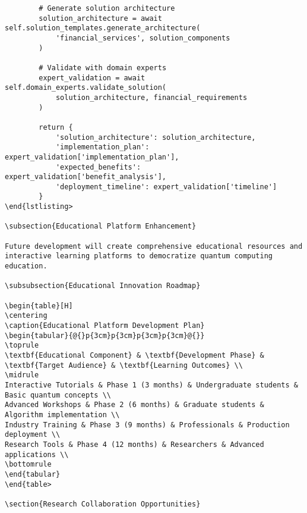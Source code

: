 \documentclass[12pt,a4paper]{report}
\begin{document}
\begin{lstlisting}
        # Generate solution architecture
        solution_architecture = await self.solution_templates.generate_architecture(
            'financial_services', solution_components
        )

        # Validate with domain experts
        expert_validation = await self.domain_experts.validate_solution(
            solution_architecture, financial_requirements
        )

        return {
            'solution_architecture': solution_architecture,
            'implementation_plan': expert_validation['implementation_plan'],
            'expected_benefits': expert_validation['benefit_analysis'],
            'deployment_timeline': expert_validation['timeline']
        }
\end{lstlisting>

\subsection{Educational Platform Enhancement}

Future development will create comprehensive educational resources and interactive learning platforms to democratize quantum computing education.

\subsubsection{Educational Innovation Roadmap}

\begin{table}[H]
\centering
\caption{Educational Platform Development Plan}
\begin{tabular}{@{}p{3cm}p{3cm}p{3cm}p{3cm}@{}}
\toprule
\textbf{Educational Component} & \textbf{Development Phase} & \textbf{Target Audience} & \textbf{Learning Outcomes} \\
\midrule
Interactive Tutorials & Phase 1 (3 months) & Undergraduate students & Basic quantum concepts \\
Advanced Workshops & Phase 2 (6 months) & Graduate students & Algorithm implementation \\
Industry Training & Phase 3 (9 months) & Professionals & Production deployment \\
Research Tools & Phase 4 (12 months) & Researchers & Advanced applications \\
\bottomrule
\end{tabular}
\end{table>

\section{Research Collaboration Opportunities}


\end{lstlisting}
\end{document}

